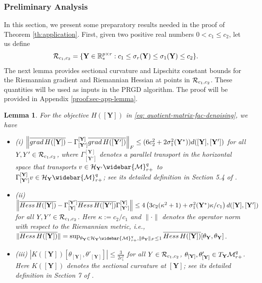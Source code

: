 \documentclass[11pt]{article}
\newtheorem{Lemma}{Lemma}
\newcommand{\bbR}{\mathbb{R}}
\newcommand{\cH}{\mathcal{H}}
\newcommand{\0}{{\mathbf{0}}}
\newcommand{\1}{{\mathbf{1}}}
\newcommand{\Y}{{\mathbf{Y}}}
\newcommand{\cR}{{\cal R}}
\newcommand{\cM}{{\cal M}}
\newcommand{\Hess}{{\rm Hess}}
\newcommand{\grad}{{\rm grad}}
\newcommand{\F}{{\rm F}}
\begin{document}
{\subsubsection{Preliminary Analysis} \label{proof:app-preliminary}
In this section, we present some preparatory results needed in the proof of Theorem \ref{th:application}. First, given two positive real numbers $0 < c_1 \leq c_2$, let us define 
\begin{equation} \label{def:Rc1c2}
	\begin{split}
		\cR_{c_1, c_2} = \{ \Y \in \bbR^{p \times r}_*: c_1 \leq \sigma_r(\Y) \leq \sigma_1(\Y) \leq c_2 \}.
	\end{split}
\end{equation} The next lemma provides sectional curvature and Lipschitz constant bounds for the Riemannian gradient and Riemannian Hessian at points in $\cR_{c_1, c_2}$. These quantities will be used as inputs in the PRGD algorithm. The proof will be provided in Appendix \ref{proof:sec-app-lemma}.
\begin{Lemma} \label{lm:curvature-lipschitz-constants}
	For the objective $H([\Y])$ in \eqref{eq: quotient-matrix-fac-denoising}, we have
	\begin{itemize}
		\item (i) $\left\|  \overline{\grad\, H([\Y])} - \Gamma_{[\Y']}^{[\Y]} \overline{\grad\, H([\Y'])} \right\|_{\F} \leq (6c_2^2 + 2 \sigma_1^2(\Y^*)) d([\Y], [\Y'] )$ for all $Y, Y' \in \cR_{c_1, c_2}$, where $\Gamma_{[\Y']}^{[\Y]}$ denotes a parallel transport in the horizontal space that transports $v \in  \cH_{\Y'}\widebar{\cM}_{r+}^{q} $ to $ \Gamma_{[\Y']}^{[\Y]} v \in  \cH_\Y\widebar{\cM}_{r+}^{q} $; see its detailed definition in Section 5.4 of \cite{absil2009optimization}.
		\item (ii) $\left \| \overline{\Hess \, H([\Y])} -  \Gamma_{[\Y]}^{[\Y']} \overline{\Hess \, H([\Y'])} \Gamma_{[\Y']}^{[\Y]} \right \| \leq 4 \left( 3 c_2 (\kappa^2 +1) + \sigma^2_1(\Y^*) \kappa/c_1  \right) d([\Y], [\Y'] )$ for all $Y, Y' \in \cR_{c_1, c_2}$. Here $\kappa :=c_2/c_1$ and $\|\cdot\|$ denotes the operator norm with respect to the Riemannian metric, i.e.,  $\| \overline{\Hess \, H([\Y])}\| = \sup_{\theta_{\Y} \in   \cH_\Y\widebar{\cM}_{r+}^{q} , \|\theta_{\Y}\|_{\F} \leq 1}  \overline{\Hess \, H([\Y])} [\theta_{\Y}, \theta_{\Y}] $.
		\item (iii) $\left| K([\Y])[\theta_{[\Y]}, \theta'_{[\Y]}] \right| \leq \frac{3}{2 c_1^2}$ for all $Y \in \cR_{c_1, c_2}$, $\theta_{[\Y]}, \theta'_{[\Y]} \in  T_{\Y} {\cM}_{r+}^{q}$. Here $K([\Y])$ denotes the sectional curvature at $[\Y]$; see its detailed definition in Section 7 of \cite{lee2018introduction}.
	\end{itemize}
\end{Lemma}




}
\end{document}
